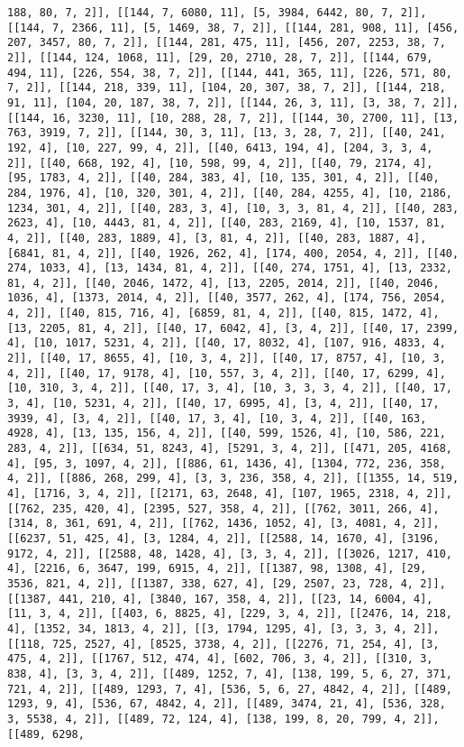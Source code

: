 \documentclass[12pt,fleqn]{article}\usepackage{../../common}
\begin{document}
\begin{verbatim}
188, 80, 7, 2]], [[144, 7, 6080, 11], [5, 3984, 6442, 80, 7, 2]], [[144, 7, 2366, 11], [5, 1469, 38, 7, 2]], [[144, 281, 908, 11], [456, 207, 3457, 80, 7, 2]], [[144, 281, 475, 11], [456, 207, 2253, 38, 7, 2]], [[144, 124, 1068, 11], [29, 20, 2710, 28, 7, 2]], [[144, 679, 494, 11], [226, 554, 38, 7, 2]], [[144, 441, 365, 11], [226, 571, 80, 7, 2]], [[144, 218, 339, 11], [104, 20, 307, 38, 7, 2]], [[144, 218, 91, 11], [104, 20, 187, 38, 7, 2]], [[144, 26, 3, 11], [3, 38, 7, 2]], [[144, 16, 3230, 11], [10, 288, 28, 7, 2]], [[144, 30, 2700, 11], [13, 763, 3919, 7, 2]], [[144, 30, 3, 11], [13, 3, 28, 7, 2]], [[40, 241, 192, 4], [10, 227, 99, 4, 2]], [[40, 6413, 194, 4], [204, 3, 3, 4, 2]], [[40, 668, 192, 4], [10, 598, 99, 4, 2]], [[40, 79, 2174, 4], [95, 1783, 4, 2]], [[40, 284, 383, 4], [10, 135, 301, 4, 2]], [[40, 284, 1976, 4], [10, 320, 301, 4, 2]], [[40, 284, 4255, 4], [10, 2186, 1234, 301, 4, 2]], [[40, 283, 3, 4], [10, 3, 3, 81, 4, 2]], [[40, 283, 2623, 4], [10, 4443, 81, 4, 2]], [[40, 283, 2169, 4], [10, 1537, 81, 4, 2]], [[40, 283, 1889, 4], [3, 81, 4, 2]], [[40, 283, 1887, 4], [6841, 81, 4, 2]], [[40, 1926, 262, 4], [174, 400, 2054, 4, 2]], [[40, 274, 1033, 4], [13, 1434, 81, 4, 2]], [[40, 274, 1751, 4], [13, 2332, 81, 4, 2]], [[40, 2046, 1472, 4], [13, 2205, 2014, 2]], [[40, 2046, 1036, 4], [1373, 2014, 4, 2]], [[40, 3577, 262, 4], [174, 756, 2054, 4, 2]], [[40, 815, 716, 4], [6859, 81, 4, 2]], [[40, 815, 1472, 4], [13, 2205, 81, 4, 2]], [[40, 17, 6042, 4], [3, 4, 2]], [[40, 17, 2399, 4], [10, 1017, 5231, 4, 2]], [[40, 17, 8032, 4], [107, 916, 4833, 4, 2]], [[40, 17, 8655, 4], [10, 3, 4, 2]], [[40, 17, 8757, 4], [10, 3, 4, 2]], [[40, 17, 9178, 4], [10, 557, 3, 4, 2]], [[40, 17, 6299, 4], [10, 310, 3, 4, 2]], [[40, 17, 3, 4], [10, 3, 3, 3, 4, 2]], [[40, 17, 3, 4], [10, 5231, 4, 2]], [[40, 17, 6995, 4], [3, 4, 2]], [[40, 17, 3939, 4], [3, 4, 2]], [[40, 17, 3, 4], [10, 3, 4, 2]], [[40, 163, 4928, 4], [13, 135, 156, 4, 2]], [[40, 599, 1526, 4], [10, 586, 221, 283, 4, 2]], [[634, 51, 8243, 4], [5291, 3, 4, 2]], [[471, 205, 4168, 4], [95, 3, 1097, 4, 2]], [[886, 61, 1436, 4], [1304, 772, 236, 358, 4, 2]], [[886, 268, 299, 4], [3, 3, 236, 358, 4, 2]], [[1355, 14, 519, 4], [1716, 3, 4, 2]], [[2171, 63, 2648, 4], [107, 1965, 2318, 4, 2]], [[762, 235, 420, 4], [2395, 527, 358, 4, 2]], [[762, 3011, 266, 4], [314, 8, 361, 691, 4, 2]], [[762, 1436, 1052, 4], [3, 4081, 4, 2]], [[6237, 51, 425, 4], [3, 1284, 4, 2]], [[2588, 14, 1670, 4], [3196, 9172, 4, 2]], [[2588, 48, 1428, 4], [3, 3, 4, 2]], [[3026, 1217, 410, 4], [2216, 6, 3647, 199, 6915, 4, 2]], [[1387, 98, 1308, 4], [29, 3536, 821, 4, 2]], [[1387, 338, 627, 4], [29, 2507, 23, 728, 4, 2]], [[1387, 441, 210, 4], [3840, 167, 358, 4, 2]], [[23, 14, 6004, 4], [11, 3, 4, 2]], [[403, 6, 8825, 4], [229, 3, 4, 2]], [[2476, 14, 218, 4], [1352, 34, 1813, 4, 2]], [[3, 1794, 1295, 4], [3, 3, 3, 4, 2]], [[118, 725, 2527, 4], [8525, 3738, 4, 2]], [[2276, 71, 254, 4], [3, 475, 4, 2]], [[1767, 512, 474, 4], [602, 706, 3, 4, 2]], [[310, 3, 838, 4], [3, 3, 4, 2]], [[489, 1252, 7, 4], [138, 199, 5, 6, 27, 371, 721, 4, 2]], [[489, 1293, 7, 4], [536, 5, 6, 27, 4842, 4, 2]], [[489, 1293, 9, 4], [536, 67, 4842, 4, 2]], [[489, 3474, 21, 4], [536, 328, 3, 5538, 4, 2]], [[489, 72, 124, 4], [138, 199, 8, 20, 799, 4, 2]], [[489, 6298, 
\end{verbatim}
\end{document}
